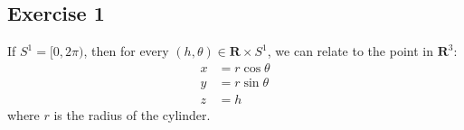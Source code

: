 \subsection{Exercise 1}
If $S^1=[0,2\pi)$, then for every $(h,\theta ) \in \mathbf{R} \times S^1$, we can relate to the point in $\mathbf{R}^3$:
\begin{align}
    x &= r\cos{\theta} \\
    y &= r\sin{\theta} \\
    z &= h
\end{align}
where $r$ is the radius of the cylinder.